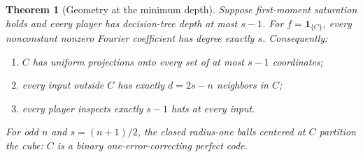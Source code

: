 \documentclass[11pt,letterpaper]{article}
\newtheorem{theorem}{Theorem}[section]
\theoremstyle{definition}
\newcommand{\indic}[1]{\mathbf 1_{\{#1\}}}
\begin{document}
\begin{theorem}[Geometry at the minimum depth]
\label{mbg:insp:thm:fin-fourier}
Suppose first-moment saturation holds and every player has decision-tree
depth at most $s-1$.  For $f=\indic{C}$, every nonconstant nonzero Fourier
coefficient has degree exactly $s$.  Consequently:
\begin{enumerate}
 \item $C$ has uniform projections onto every set of at most $s-1$
 coordinates;
 \item every input outside $C$ has exactly $d=2s-n$ neighbors in $C$;
 \item every player inspects exactly $s-1$ hats at every input.
\end{enumerate}
For odd $n$ and $s=(n+1)/2$, the closed radius-one balls centered at $C$
partition the cube: $C$ is a binary one-error-correcting perfect code.
\end{theorem}
\end{document}
